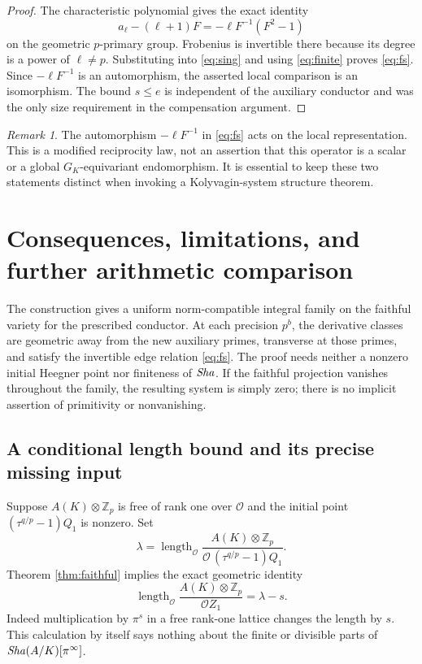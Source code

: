 \documentclass[11pt]{article}
\theoremstyle{definition}\newtheorem{definition}[theorem]{Definition}
\theoremstyle{remark}\newtheorem{remark}[theorem]{Remark}
\newcommand{\Zp}{\mathbb Z_p}\newcommand{\Qp}{\mathbb Q_p}
\newcommand{\OO}{\mathcal O}\newcommand{\Tr}{\operatorname{Tr}}
\begin{document}
\begin{proof}
The characteristic polynomial gives the exact identity
\[
 a_\ell-(\ell+1)F=-\ell F^{-1}(F^2-1)
\]
on the geometric $p$-primary group. Frobenius is invertible there because its degree is a power of $\ell\ne p$. Substituting into \eqref{eq:sing} and using \eqref{eq:finite} proves \eqref{eq:fs}. Since $-\ell F^{-1}$ is an automorphism, the asserted local comparison is an isomorphism. The bound $s\le e$ is independent of the auxiliary conductor and was the only size requirement in the compensation argument.
\end{proof}

\begin{remark}
The automorphism $-\ell F^{-1}$ in \eqref{eq:fs} acts on the local representation. This is a modified reciprocity law, not an assertion that this operator is a scalar or a global $G_K$-equivariant endomorphism. It is essential to keep these two statements distinct when invoking a Kolyvagin-system structure theorem.
\end{remark}

\section{Consequences, limitations, and further arithmetic comparison}
The construction gives a uniform norm-compatible integral family on the faithful variety for the prescribed conductor. At each precision $p^b$, the derivative classes are geometric away from the new auxiliary primes, transverse at those primes, and satisfy the invertible edge relation \eqref{eq:fs}. The proof needs neither a nonzero initial Heegner point nor finiteness of $\mathrm{\mathit{Sha}}$. If the faithful projection vanishes throughout the family, the resulting system is simply zero; there is no implicit assertion of primitivity or nonvanishing.

\subsection{A conditional length bound and its precise missing input}
Suppose $A(K)\otimes\Zp$ is free of rank one over $\OO$ and the initial point $(\tau^{q/p}-1)Q_1$ is nonzero. Set
\[
 \lambda=\operatorname{length}_{\OO}\frac{A(K)\otimes\Zp}{\OO\, (\tau^{q/p}-1)Q_1}.
\]
Theorem \ref{thm:faithful} implies the exact geometric identity
\begin{equation}\label{eq:index}
 \operatorname{length}_{\OO}\frac{A(K)\otimes\Zp}{\OO Z_1}=\lambda-s.
\end{equation}
Indeed multiplication by $\pi^s$ in a free rank-one lattice changes the length by $s$. This calculation by itself says nothing about the finite or divisible parts of $\mathrm{\mathit{Sha}}(A/K)[\pi^\infty]$.
\end{document}
